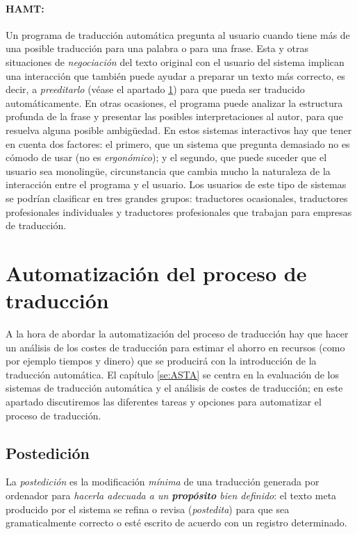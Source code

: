 \paragraph{HAMT:} Un programa de traducción automática pregunta al usuario cuando tiene más de una posible traducción para una palabra o para una frase. Esta y otras situaciones de \emph{negociación} del texto original con el usuario del sistema implican una interacción que también puede ayudar a preparar un texto más correcto, es decir, a \emph{preeditarlo} (véase el apartado \ref{ss:preedposted}) para que pueda ser traducido automáticamente. En otras ocasiones, el programa puede analizar la estructura profunda de la frase y presentar las posibles interpretaciones al autor, para que resuelva alguna posible ambigüedad. En estos sistemas interactivos hay que tener en cuenta dos factores: el primero, que un sistema que pregunta demasiado no es cómodo de usar (no es \emph{ergonómico}); y el segundo, que puede suceder que el usuario sea monolingüe, circunstancia que cambia mucho la naturaleza de la interacción entre el programa y el usuario. Los usuarios de este tipo de sistemas se podrían clasificar en tres grandes grupos: traductores ocasionales, traductores profesionales individuales y traductores profesionales que trabajan para empresas de traducción. 

\section{Automatización del proceso de traducción} \label{ss:preedposted} A la hora de abordar la automatización del proceso de traducción hay que hacer un análisis de los costes de traducción para estimar el ahorro en recursos (como por ejemplo tiempos y dinero) que se producirá con la introducción de la traducción automática. El capítulo \ref{se:ASTA} se centra en la evaluación de los sistemas de traducción automática y el análisis de costes de traducción; en este apartado discutiremos las diferentes tareas y opciones para automatizar el proceso de traducción. 

\subsection{Postedición} \label{ss:postedicio} La \emph{postedición} es la modificación \emph{mínima} de una traducción generada por ordenador para \emph{hacerla adecuada a un \textbf{propósito} bien definido}: el texto meta producido por el sistema se refina o revisa ({\em postedita}) para que sea gramaticalmente correcto o esté escrito de acuerdo con un registro determinado. 

